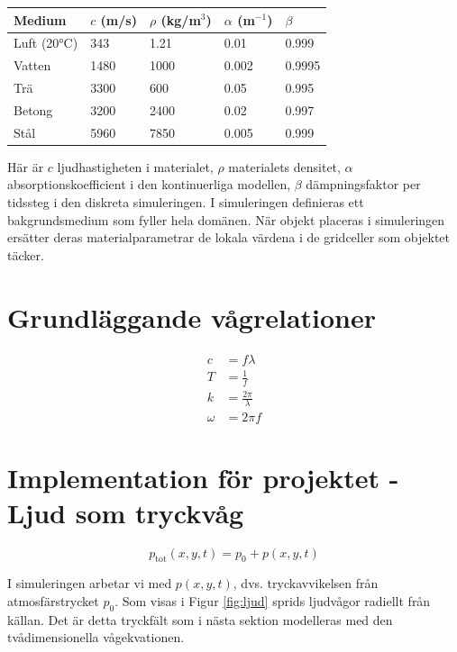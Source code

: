 \documentclass[11pt,a4paper]{article}
\begin{document}
\begin{center}
\begin{tabular}{lllll}
\hline
Medium & $c$ (m/s) & $\rho$ (kg/m$^3$) & $\alpha$ (m$^{-1}$) & $\beta$ \\
\hline

Luft (20°C) & 343 & 1.21 & 0.01 & 0.999 \\

Vatten & 1480 & 1000 & 0.002 & 0.9995 \\

Trä & 3300 & 600 & 0.05 & 0.995 \\

Betong & 3200 & 2400 & 0.02 & 0.997 \\

Stål & 5960 & 7850 & 0.005 & 0.999 \\

\hline
\end{tabular}
\end{center}

Här är \quad $c$ ljudhastigheten i materialet, \quad $\rho$ 
materialets densitet, \quad $\alpha$ absorptionskoefficient 
i den kontinuerliga modellen, \quad $\beta$ dämpningsfaktor 
per tidssteg i den diskreta simuleringen.
I simuleringen definieras ett bakgrundsmedium som fyller hela
domänen. När objekt placeras i simuleringen ersätter deras
materialparametrar de lokala värdena i de gridceller som objektet
täcker.


\section{Grundläggande vågrelationer}
\begin{align}
c &= f\lambda \\
T &= \frac{1}{f} \\
k &= \frac{2\pi}{\lambda} \\
\omega &= 2\pi f
\end{align}


\section{Implementation för projektet - Ljud som tryckvåg}
\begin{equation}
p_{\text{tot}}(x,y,t) = p_0 + p(x,y,t)
\end{equation}

I simuleringen arbetar vi med $p(x,y,t)$, dvs. 
tryckavvikelsen från atmosfärstrycket $p_0$. Som visas i 
Figur \ref{fig:ljud} sprids ljudvågor radiellt från källan.
Det är detta tryckfält som i nästa sektion modelleras med
den tvådimensionella vågekvationen.
\end{document}
